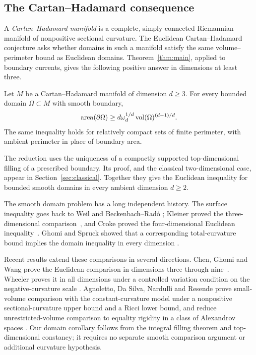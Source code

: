 \subsection{The Cartan--Hadamard consequence}

A \emph{Cartan--Hadamard manifold} is a complete, simply connected
Riemannian manifold of nonpositive sectional curvature. The Euclidean
Cartan--Hadamard conjecture asks whether domains in such a manifold
satisfy the same volume--perimeter bound as Euclidean domains.
Theorem~\ref{thm:main}, applied to boundary currents, gives the
following positive answer in dimensions at least three.

\begin{corollary}\label{cor:cartan-hadamard}
Let $M$ be a Cartan--Hadamard manifold of dimension $d\ge3$.
For every bounded domain $\Omega\subset M$ with smooth boundary,
\begin{equation}\label{eq:classical}
 \operatorname{area}(\partial\Omega)
 \ge d\omega_d^{1/d}\operatorname{vol}(\Omega)^{(d-1)/d}.
\end{equation}
The same inequality holds for relatively compact sets of finite
perimeter, with ambient perimeter in place of boundary area.
\end{corollary}

The reduction uses the uniqueness of a compactly supported
top-dimensional filling of a prescribed boundary. Its proof, and the
classical two-dimensional case, appear in Section~\ref{sec:classical}.
Together they give the Euclidean inequality for bounded smooth domains
in every ambient dimension $d\ge2$.

The smooth domain problem has a long independent history. The surface
inequality goes back to Weil and Beckenbach--Rad\'o
\cite{Weil1926,BeckenbachRado1933}; Kleiner proved the
three-dimensional comparison~\cite{Kleiner1992}, and Croke proved
the four-dimensional Euclidean inequality~\cite{Croke1984}.
Ghomi and Spruck showed that a corresponding total-curvature bound
implies the domain inequality in every dimension
\cite[Theorem~7.1]{GhomiSpruck2022}.

Recent results extend these comparisons in several directions. Chen,
Ghomi and Wang prove the Euclidean comparison in dimensions three
through nine~\cite[Theorem~1.1]{ChenGhomiWang2026HigherDimensions}.
Wheeler proves it in all dimensions under a controlled variation
condition on the negative-curvature scale
\cite[Theorem~1.1 and Definition~1.2]{Wheeler2026}.
Agnoletto, Da Silva, Nardulli and Resende prove small-volume comparison
with the constant-curvature model under a nonpositive sectional-curvature
upper bound and a Ricci lower bound,
and reduce unrestricted-volume comparison to equality rigidity in a
class of Alexandrov spaces
\cite[Theorems~1.1 and~1.3; Assumption~1]{AgnolettoDaSilvaNardulliResende2026}.
Our domain corollary follows from the integral filling theorem and
top-dimensional constancy; it requires no separate smooth comparison
argument or additional curvature hypothesis.

